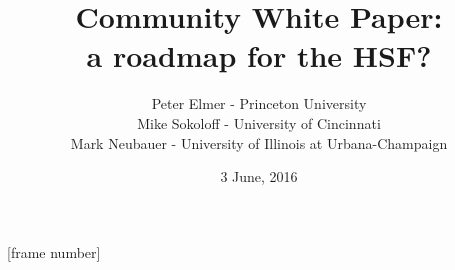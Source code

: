 \documentclass{beamer}
\title{Community White Paper: \\ a roadmap for the HSF?}
\author{Peter Elmer - Princeton University \\
        Mike Sokoloff - University of Cincinnati \\
        Mark Neubauer - University of Illinois at Urbana-Champaign}
\date{3 June, 2016}
\begin{document}
\maketitle

%
%

[frame number]







%








%


\end{document}
